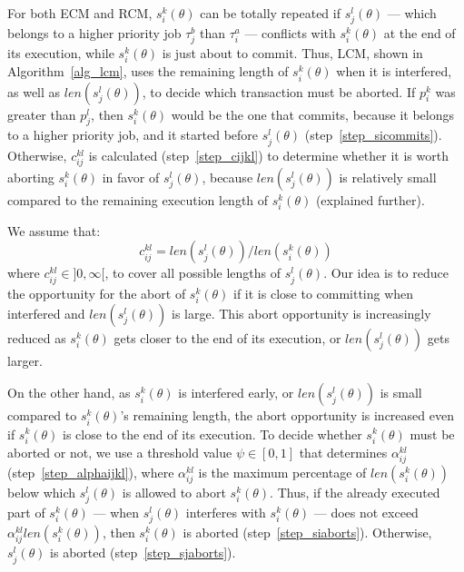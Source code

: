 \documentclass[letter]{sig-alternate}
\begin{document}
For both ECM and RCM, $s_{i}^{k}(\theta)$ can be totally repeated if $s_{j}^{l}(\theta)$ --- which belongs to a higher priority job $\tau_{j}^b$ than $\tau_{i}^a$ --- conflicts with $s_{i}^{k}(\theta)$
at the end of its execution, while $s_{i}^{k}(\theta)$ is just about
to commit. Thus, LCM, shown in Algorithm~\ref{alg_lcm}, uses the remaining length of $s_{i}^{k}(\theta)$ when it is interfered,
as well as $len(s_{j}^{l}(\theta))$, to decide which transaction must be aborted. If $p_i^k$ was greater than $p_j^l$, then $s_i^k(\theta)$ would be the one that commits, because it belongs to a higher priority job, and it started before $s_j^l(\theta)$ (step~\ref{step_sicommits}). Otherwise, $c_{ij}^{kl}$ is calculated (step~\ref{step_cijkl}) to determine whether it is worth aborting $s_i^k(\theta)$ in favor of $s_j^l(\theta)$, because $len(s_j^l(\theta))$ is relatively small compared to the remaining execution length of $s_i^k(\theta)$  (explained further).

We assume that:
\begin{equation}
c_{ij}^{kl}=len(s_{j}^{l}(\theta))/len(s_{i}^{k}(\theta))
\label{cm_eq}\end{equation}
where $c_{ij}^{kl}\in]0,\infty[$, to cover all possible lengths of $s_{j}^{l}(\theta)$.
Our idea is to reduce the opportunity for the abort of $s_{i}^{k}(\theta)$ if it is close to committing when interfered and $len(s_{j}^{l}(\theta))$ is large. This abort opportunity is increasingly reduced as $s_{i}^{k}(\theta)$ gets closer to the end of its execution, or $len(s_{j}^{l}(\theta))$ gets larger. 

On the other hand, as $s_{i}^{k}(\theta)$ is interfered early,
or $len(s_{j}^{l}(\theta))$ is small compared to $s_{i}^{k}(\theta)$'s remaining length, the abort opportunity 
is increased even if $s_i^k (\theta)$ is close to the end of its execution. To decide whether $s_{i}^{k}(\theta)$ must be aborted or not, we use a threshold value $\psi\in[0,1]$ that determines $\alpha_{ij}^{kl}$ (step~\ref{step_alphaijkl}), where $\alpha_{ij}^{kl}$ is the maximum percentage of $len(s_i^k(\theta))$ below which $s_j^l(\theta)$ is allowed to abort $s_i^k(\theta)$. Thus, if the already executed part of $s_i^k(\theta)$ --- when $s_j^l(\theta)$ interferes with $s_i^k(\theta)$ --- does not exceed $\alpha_{ij}^{kl}len(s_i^k(\theta))$, then $s_i^k(\theta)$ is aborted (step~\ref{step_siaborts}). Otherwise, $s_j^l(\theta)$ is aborted (step~\ref{step_sjaborts}).
\end{document}
